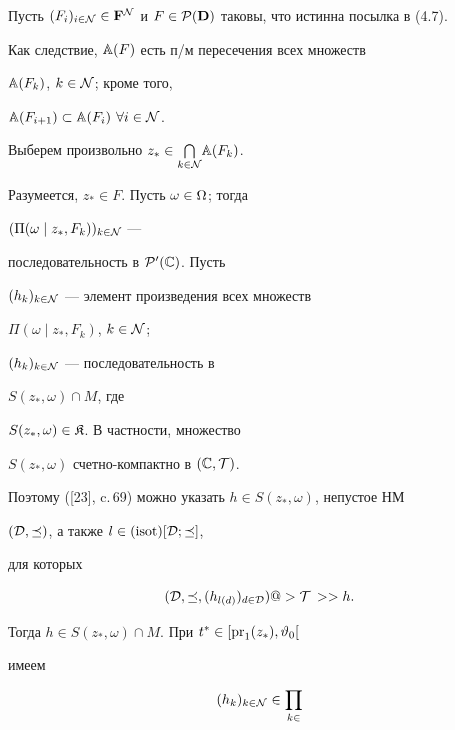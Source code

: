 \begin{pf}


Пусть $(F_i)_{i \in {\cal N}} \in {{\bold F}^{\cal


N}}$ и $F \in {{\cal P}({\bold D})}$ таковы, что истинна посылка в (4.7).


Как следствие, ${\Bbb A}(F)$ есть п/м пересечения всех множеств


${{\Bbb A}(F_k)}$, $k \in {\cal N}$; кроме того,


${{\Bbb A}(F_{i+1})} \subset {{\Bbb A}(F_i)}$ $\forall{i} \in {\cal N}$.


Выберем произвольно ${z_*} \in


{\bigcap\limits_{k \in {\cal N}}}{{\Bbb A}(F_k)}$.


Разумеется, ${z_*} \in F$. Пусть $\omega \in \Omega$; тогда


$({\Pi}(\omega \mid {z_*},{F_k}))_{k \in {\cal N}}$ ---


последовательность в ${{\cal P}'}({\Bbb C})$. Пусть


$(h_k)_{k \in {\cal N}}$ --- элемент произведения всех множеств


${\Pi}(\omega \mid {z_*},{F_k})$, $k \in {\cal N}$;


$(h_k)_{k \in {\cal N}}$ --- последовательность в


$S({z_*},\omega) \cap M$, где


$S({z_*},\omega) \in {\frak K}$. В частности, множество


$S({z_*},\omega)$ счетно-компактно в $({\Bbb C},{\cal T})$.


Поэтому ([23], c.\,69) можно указать $h \in S({z_*},\omega)$, непустое НМ


$({\cal D},\preceq)$, а также $l \in (\operatorname{isot})[{\cal D};\preceq]$,


для которых


\begin{equation}


({\cal D},\preceq,(h_{l(d)})_{d \in {\cal D}}) @>{\cal T\,}>> h.


\end{equation}


Тогда $h \in S({z_*},\omega) \cap M$. При ${t^*} \in


[{\pr_1}({z_*}),{{\vt}_0}[$


имеем


\begin{equation}


{(h_k)_{k \in {\cal N}}} \in {\prod\limits_{k \in


}}
\end{equation}
\end{pf}
